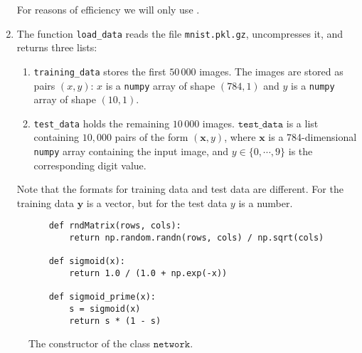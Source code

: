 \begin{enumerate}
      For reasons of efficiency we will only use . 
\item The function \texttt{load\_data} reads the file \texttt{mnist.pkl.gz}, uncompresses it,
      and returns three lists:
      \begin{enumerate}
      \item \texttt{training\_data} stores the first $50\,000$ images.
            The images are stored as pairs $(x,y)$: $x$ is a \texttt{numpy} array of shape $(784,1)$ and $y$ is a
            \texttt{numpy} array of shape $(10, 1)$.
      \item \texttt{test\_data} holds the remaining $10\,000$ images.
            $\texttt{test\_data}$ is a list containing $10,000$  pairs of the form $(\textbf{x}, y)$,
            where $\textbf{x}$ is a 784-dimensional \texttt{numpy} array containing the input image, 
            and $y \in \{0,\cdots,9\}$ is the corresponding digit value.            
      \end{enumerate}
      Note that the formats for training data and test data are different. 
      For the training data $\textbf{y}$ is a vector, but for the test data $y$ is a number.
\end{enumerate}

\begin{figure}[!ht]
\centering
\begin{verbatim}
    def rndMatrix(rows, cols):
        return np.random.randn(rows, cols) / np.sqrt(cols)

    def sigmoid(x):
        return 1.0 / (1.0 + np.exp(-x))    
    
    def sigmoid_prime(x):
        s = sigmoid(x)
        return s * (1 - s)
\end{verbatim}
\vspace*{-0.3cm}
\caption{The constructor of the class $\mathtt{network}$.}
\label{fig:Digit-Regocnition.ipynb-2}
\end{figure}

